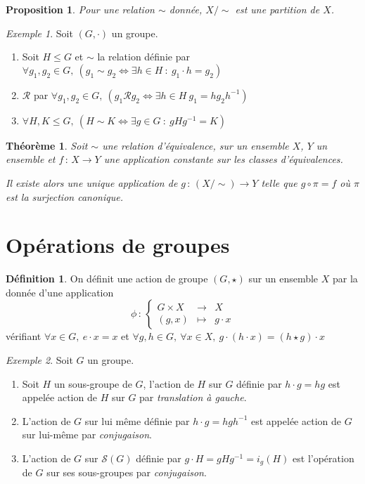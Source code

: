 \documentclass[]{article}
\newtheorem{mythm}{Théorème}
\newtheorem{myproposition}{Proposition}
\theoremstyle{remark}
\newtheorem{myexmpl}{Exemple}
\theoremstyle{definition}
\newtheorem{mydef}{Définition}
\newcommand{\func}[5]{
#1 \, : \, \left\{ \begin{array}{lcl}
	#2 & \longrightarrow & #3 \\
	#4 & \longmapsto & #5
\end{array}
\right.
}
\newcommand{\funcshort}[3]{
#1 \, : \, #2 \longrightarrow #3
}
\begin{document}
\begin{myproposition}
	Pour une relation $\sim$ donnée, $X/\sim$ est une partition de $X$.
\end{myproposition}

\begin{myexmpl}
	Soit $(G, \cdot)$ un groupe.
	
	\begin{enumerate}
		\item Soit $H \leqslant G$ et $\sim$ la relation définie par $\forall g_1, g_2 \in G, ~ (g_1 \sim g_2 \Longleftrightarrow \exists h \in H ~ : ~ g_1 \cdot h=g_2)$
		
		\item $\mathcal{R}$ par $\forall g_1, g_2 \in G, ~ (g_1 \mathcal{R} g_2 \Longleftrightarrow \exists h \in H ~ g_1 = h g_2 h^{-1})$
		
		\item $\forall H, K \leqslant G, ~ (H \sim K \Longleftrightarrow \exists g \in G ~ : ~ gHg^{-1}=K)$
	\end{enumerate}
\end{myexmpl}

\begin{mythm}
	Soit $\sim$ une relation d'équivalence, sur un ensemble $X$, $Y$ un ensemble et $\funcshort{f}{X}{Y}$ une application constante sur les classes d'équivalences.
	
	Il existe alors une unique application de $\funcshort{g}{(X/\sim)}{Y}$ telle que $g\circ \pi=f$ où $\pi$ est la surjection canonique.
\end{mythm}

\section{Opérations de groupes}

\begin{mydef}
	On définit une action de groupe $(G, \star)$ sur un ensemble $X$ par la donnée d'une application $$\func{\phi}{G \times X}{X}{(g,x)}{g \cdot x}$$
	vérifiant $\forall x \in G, ~ e \cdot x = x$ et $\forall g, h \in G, ~ \forall x \in X, ~ g \cdot (h \cdot x) = (h \star g) \cdot x$
\end{mydef}

\begin{myexmpl}
	Soit $G$ un groupe.
	\begin{enumerate}
		\item Soit $H$ un sous-groupe de $G$, l'action de $H$ sur $G$ définie par $h\cdot g = hg$ est appelée action de $H$ sur $G$ par \textit{translation à gauche}.
		
		\item L'action de $G$ sur lui même définie par $h\cdot g = hgh^{-1}$ est appelée action de $G$ sur lui-même par \textit{conjugaison}.
		
		\item L'action de $G$ sur $\mathcal{S}(G)$ définie par $g \cdot H=gHg^{-1}=i_g(H)$ est l'opération de $G$ sur ses sous-groupes par \textit{conjugaison}.
	\end{enumerate}
\end{myexmpl}
\end{document}

